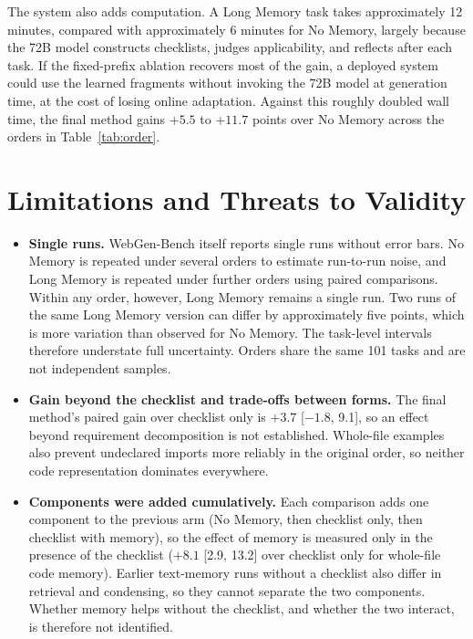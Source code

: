 The system also adds computation. A Long Memory task takes approximately 12 minutes, compared with approximately 6 minutes for No Memory, largely because the 72B model constructs checklists, judges applicability, and reflects after each task. If the fixed-prefix ablation recovers most of the gain, a deployed system could use the learned fragments without invoking the 72B model at generation time, at the cost of losing online adaptation. Against this roughly doubled wall time, the final method gains $+5.5$ to $+11.7$ points over No Memory across the orders in Table~\ref{tab:order}.

\section{Limitations and Threats to Validity}
\label{sec:threats}
\begin{itemize}
  \item \textbf{Single runs.} WebGen-Bench itself reports single runs without error bars. No Memory is repeated under several orders to estimate run-to-run noise, and Long Memory is repeated under further orders using paired comparisons. Within any order, however, Long Memory remains a single run. Two runs of the same Long Memory version can differ by approximately five points, which is more variation than observed for No Memory. The task-level intervals therefore understate full uncertainty. Orders share the same 101 tasks and are not independent samples. 
  \item \textbf{Gain beyond the checklist and trade-offs between forms.} The final method's paired gain over checklist only is $+3.7$ [$-1.8$, 9.1], so an effect beyond requirement decomposition is not established. Whole-file examples also prevent undeclared imports more reliably in the original order, so neither code representation dominates everywhere.
  \item \textbf{Components were added cumulatively.} Each comparison adds one component to the previous arm (No Memory, then checklist only, then checklist with memory), so the effect of memory is measured only in the presence of the checklist ($+8.1$ [2.9, 13.2] over checklist only for whole-file code memory). Earlier text-memory runs without a checklist also differ in retrieval and condensing, so they cannot separate the two components. Whether memory helps without the checklist, and whether the two interact, is therefore not identified.

\end{itemize}
